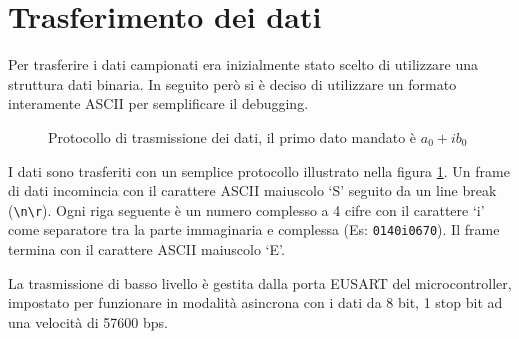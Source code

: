 \section{Trasferimento dei dati}
Per trasferire i dati campionati era inizialmente stato scelto di utilizzare
una struttura dati binaria. In seguito per\`o si \`e deciso di utilizzare un
formato interamente ASCII per semplificare il debugging.

\begin{figure}[H] \centering
    \caption[Protocollo di trasmissione dei dati]{
        Protocollo di trasmissione dei dati, il primo dato mandato \`e
        \(a_0+ib_0\)
        \label{fig:proto}
    }
\end{figure}
I dati sono trasferiti con un semplice protocollo illustrato nella figura
\ref{fig:proto}. Un frame di dati incomincia con il carattere ASCII maiuscolo
`S' seguito da un line break (\texttt{\textbackslash n\textbackslash r}). Ogni
riga seguente \`e un numero complesso a 4 cifre con il carattere `i' come
separatore tra la parte immaginaria e complessa (Es: \texttt{0140i0670}). Il
frame termina con il carattere ASCII maiuscolo `E'.

La trasmissione di basso livello \`e gestita dalla porta EUSART del
microcontroller, impostato per funzionare in modalit\`a asincrona con i dati
da 8 bit, 1 stop bit ad una velocit\`a di 57600 bps.

